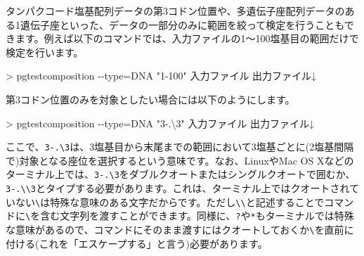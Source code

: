 \documentclass[titlepage,10pt,a4paper]{jsbook}
\newenvironment{cmd}{\begin{oframed}\raggedright\ttfamily\footnotesize\setlength{\baselineskip}{1.4em}}{\end{oframed}\vspace{-1em}}
\begin{document}
タンパクコード塩基配列データの第3コドン位置や、多遺伝子座配列データのある1遺伝子座といった、データの一部分のみに範囲を絞って検定を行うこともできます。例えば以下のコマンドでは、入力ファイルの1～100塩基目の範囲だけで検定を行います。
\begin{cmd}
{\textgreater} pgtestcomposition {-}{-}type=DNA "1-100" 入力ファイル 出力ファイル↓
\end{cmd}
第3コドン位置のみを対象としたい場合には以下のようにします。
\begin{cmd}
{\textgreater} pgtestcomposition {-}{-}type=DNA "3-.{\textbackslash}3" 入力ファイル 出力ファイル↓
\end{cmd}
ここで、\texttt{3-.{\textbackslash}3}は、3塩基目から末尾までの範囲において3塩基ごとに(2塩基間隔で)対象となる座位を選択するという意味です。なお、LinuxやMac OS Xなどのターミナル上では、\texttt{3-.{\textbackslash}3}をダブルクオートまたはシングルクオートで囲むか、\texttt{3-.{\textbackslash}{\textbackslash}3}とタイプする必要があります。これは、ターミナル上ではクオートされていない\texttt{{\textbackslash}}は特殊な意味のある文字だからです。ただし\texttt{{\textbackslash}{\textbackslash}}と記述することでコマンドに\texttt{{\textbackslash}}を含む文字列を渡すことができます。同様に、\texttt{?}や\texttt{*}もターミナルでは特殊な意味があるので、コマンドにそのまま渡すにはクオートしておくか\texttt{\textbackslash}を直前に付ける(これを「エスケープする」と言う)必要があります。
\end{document}

